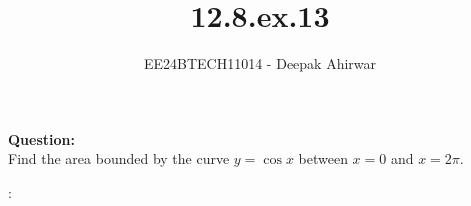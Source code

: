 \documentclass[journal]{IEEEtran}
\begin{document}

\vspace{3cm}

\title{12.8.ex.13}
\author{EE24BTECH11014 - Deepak Ahirwar}

{\let\newpage\relax\maketitle}

\renewcommand{\thefigure}{\theenumi}
\renewcommand{\thetable}{\theenumi}
\setlength{\intextsep}{10pt} %

\textbf{Question:}\\

Find the area bounded by the curve $y =\cos{x}$ between $x = 0$ and $x = 2 \pi$.

\solution:\\
\end{document}
